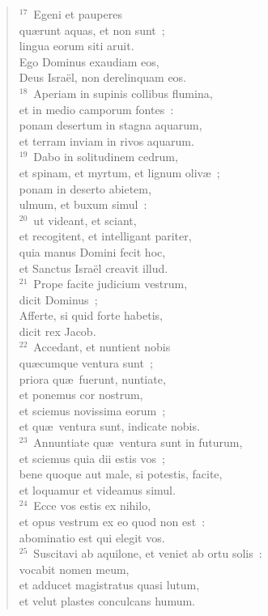 \begin{flushleft}
\begin{verse}
${}^{17}$~Egeni et pauperes\\ qu\ae runt aquas, et non sunt~;\\ lingua eorum siti aruit.\\ Ego Dominus exaudiam eos,\\ Deus Isra\"el, non derelinquam eos.\\
${}^{18}$~Aperiam in supinis collibus flumina,\\ et in medio camporum fontes~:\\ ponam desertum in stagna aquarum,\\ et terram inviam in rivos aquarum.\\
${}^{19}$~Dabo in solitudinem cedrum,\\ et spinam, et myrtum, et lignum oliv\ae~;\\ ponam in deserto abietem,\\ ulmum, et buxum simul~:\\
${}^{20}$~ut videant, et sciant,\\ et recogitent, et intelligant pariter,\\ quia manus Domini fecit hoc,\\ et Sanctus Isra\"el creavit illud.\\
${}^{21}$~Prope facite judicium vestrum,\\ dicit Dominus~;\\ Afferte, si quid forte habetis,\\ dicit rex Jacob.\\
${}^{22}$~Accedant, et nuntient nobis\\ qu\ae cumque ventura sunt~;\\ priora qu\ae\ fuerunt, nuntiate,\\ et ponemus cor nostrum,\\ et sciemus novissima eorum~;\\ et qu\ae\ ventura sunt, indicate nobis.\\
${}^{23}$~Annuntiate qu\ae\ ventura sunt in futurum,\\ et sciemus quia dii estis vos~;\\ bene quoque aut male, si potestis, facite,\\ et loquamur et videamus simul.\\
${}^{24}$~Ecce vos estis ex nihilo,\\ et opus vestrum ex eo quod non est~:\\ abominatio est qui elegit vos.\\
${}^{25}$~Suscitavi ab aquilone, et veniet ab ortu solis~:\\ vocabit nomen meum,\\ et adducet magistratus quasi lutum,\\ et velut plastes conculcans humum.\\

\end{verse}
\end{flushleft}
